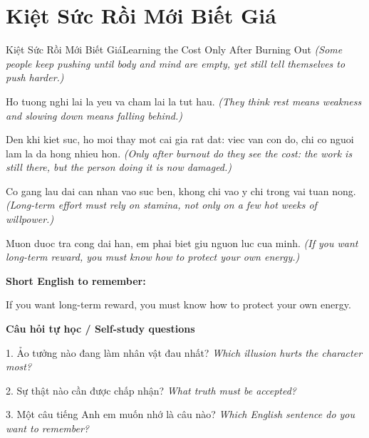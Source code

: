 \section{Kiệt Sức Rồi Mới Biết Giá}
\begin{truyen}{Kiệt Sức Rồi Mới Biết Giá}{Learning the Cost Only After Burning Out}
\textit{(Some people keep pushing until body and mind are empty, yet still tell themselves to push harder.)}

Ho tuong nghi lai la yeu va cham lai la tut hau.
\textit{(They think rest means weakness and slowing down means falling behind.)}

Den khi kiet suc, ho moi thay mot cai gia rat dat: viec van con do, chi co nguoi lam la da hong nhieu hon.
\textit{(Only after burnout do they see the cost: the work is still there, but the person doing it is now damaged.)}

Co gang lau dai can nhan vao suc ben, khong chi vao y chi trong vai tuan nong.
\textit{(Long-term effort must rely on stamina, not only on a few hot weeks of willpower.)}

\end{truyen}

\begin{baihoc}
Muon duoc tra cong dai han, em phai biet giu nguon luc cua minh.
\textit{(If you want long-term reward, you must know how to protect your own energy.)}
\end{baihoc}

\begin{ghinhoanh}
\textbf{Short English to remember:}

If you want long-term reward, you must know how to protect your own energy.

\end{ghinhoanh}

\begin{tuhocnhanh}
\textbf{Câu hỏi tự học / Self-study questions}

1. Ảo tưởng nào đang làm nhân vật đau nhất? \textit{Which illusion hurts the character most?}

2. Sự thật nào cần được chấp nhận? \textit{What truth must be accepted?}

3. Một câu tiếng Anh em muốn nhớ là câu nào? \textit{Which English sentence do you want to remember?}
\end{tuhocnhanh}
\ngancach

